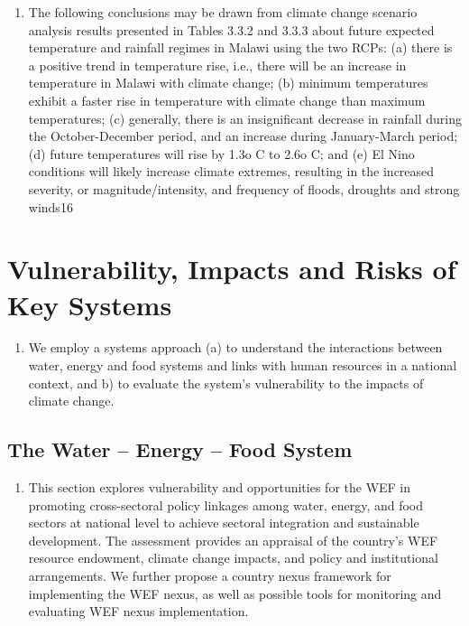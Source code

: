 \documentclass[
]{book}
\providecommand{\tightlist}{%
  \setlength{\itemsep}{0pt}\setlength{\parskip}{0pt}}
\begin{document}
\begin{enumerate}
\def\labelenumi{\arabic{enumi}.}
\setcounter{enumi}{51}
\tightlist
\item
  The following conclusions may be drawn from climate change scenario analysis results presented in Tables 3.3.2 and 3.3.3 about future expected temperature and rainfall regimes in Malawi using the two RCPs: (a) there is a positive trend in temperature rise, i.e., there will be an increase in temperature in Malawi with climate change; (b) minimum temperatures exhibit a faster rise in temperature with climate change than maximum temperatures; (c) generally, there is an insignificant decrease in rainfall during the October-December period, and an increase during January-March period; (d) future temperatures will rise by 1.3o C to 2.6o C; and (e) El Nino conditions will likely increase climate extremes, resulting in the increased severity, or magnitude/intensity, and frequency of floods, droughts and strong winds16
\end{enumerate}

\hypertarget{vulnerability-impacts-and-risks-of-key-systems}{%
\section{Vulnerability, Impacts and Risks of Key Systems}\label{vulnerability-impacts-and-risks-of-key-systems}}

\begin{enumerate}
\def\labelenumi{\arabic{enumi}.}
\setcounter{enumi}{52}
\tightlist
\item
  We employ a systems approach (a) to understand the interactions between water, energy and food systems and links with human resources in a national context, and b) to evaluate the system's vulnerability to the impacts of climate change.
\end{enumerate}

\hypertarget{the-water-energy-food-system}{%
\subsection{The Water -- Energy -- Food System}\label{the-water-energy-food-system}}

\begin{enumerate}
\def\labelenumi{\arabic{enumi}.}
\setcounter{enumi}{3}
\tightlist
\item
  This section explores vulnerability and opportunities for the WEF in promoting cross-sectoral policy linkages among water, energy, and food sectors at national level to achieve sectoral integration and sustainable development. The assessment provides an appraisal of the country's WEF resource endowment, climate change impacts, and policy and institutional arrangements. We further propose a country nexus framework for implementing the WEF nexus, as well as possible tools for monitoring and evaluating WEF nexus implementation.
\end{enumerate}
\end{document}
